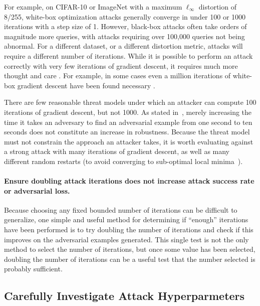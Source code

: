 \documentclass{article} %
\begin{document}
For example, on
CIFAR-10 or ImageNet with a maximum $\ell_\infty$ distortion of 8/255,
white-box optimization attacks generally converge in under 100 or 1000
iterations with a step size of 1.
%
However, black-box attacks often take orders of magnitude more queries,
with attacks requiring over 100,000 queries not being abnormal.
%
For a different dataset, or a different
distortion metric, attacks will require a different number of iterations.
%
While it is
possible to perform an attack correctly with very few iterations
of gradient descent, it requires much more thought and care \citep{engstrom2018evaluating}.
%
For example, in some cases even a million iterations of white-box gradient descent
have been found necessary \citep{qian2018l2}.

There are few reasonable threat models under which an attacker can
compute 100 iterations of gradient descent, but not 1000. As stated in~\cite{athalye2018obfuscated}, merely increasing the time it takes an adversary to find an adversarial example from one second to ten seconds does not constitute an increase in robustness.
%
Because the threat model must not constrain the approach an
attacker takes, it is worth evaluating against a strong attack
with many iterations of gradient descent, as well as many different random restarts (to avoid converging to sub-optimal local minima~\citep{madry2017towards,mosbach2018logit}).

\paragraph{Ensure doubling attack iterations does not increase attack success rate or adversarial loss.}
%
Because choosing any fixed bounded number of iterations can be difficult to
generalize, one simple and useful method for determining if ``enough'' iterations
have been performed is to try doubling the number of iterations and check if this
improves on the adversarial examples generated.
%
This single test is not the only method to select the number of iterations,
but once some value has been selected, doubling the number of iterations
can be a useful test that the number selected is probably sufficient.



\subsection{Carefully Investigate Attack Hyperparmeters}
\label{sec:hyperparams}
\end{document}
